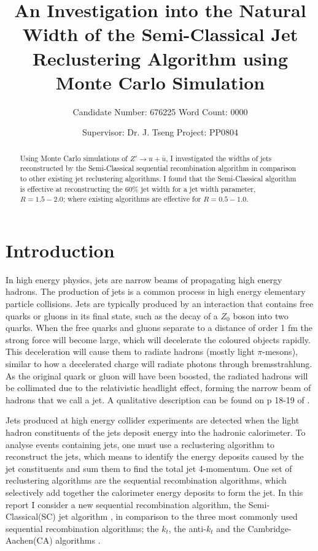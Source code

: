 \documentclass[a4paper,11pt, onecolumn]{article}
\title{\vspace{-0.3 in} An Investigation into the Natural Width of the Semi-Classical Jet Reclustering Algorithm using Monte Carlo Simulation \vspace{-1ex}}
\author{Candidate Number: 676225  \hspace{1in}     Word Count: 0000}
\date{\vspace{-2ex}\hspace{-0.25in}Supervisor: Dr. J. Tseng \hspace{1.2in} Project: PP0804 }
\begin{document}
    \maketitle
    \vspace{-1cm}
    \begin{abstract}
     
         \normalsize
         Using Monte Carlo simulations of $Z' \to u + \bar{u}$, I investigated the widths of jets reconstructed by the Semi-Classical sequential recombination
         algorithm in comparison to other existing jet reclustering algorithms. I found that the Semi-Classical algorithm
         is effective at reconstructing the 60\% jet width for a jet width parameter, $R = 1.5-2.0$; where existing algorithms are effective
         for $R = 0.5-1.0$.
   
    \end{abstract}


\section*{Introduction}

 In high energy physics, jets are narrow beams of propagating high energy hadrons. 
 The production of jets is a common process in high energy elementary particle collisions. Jets are typically 
 produced by an interaction that contains free quarks or gluons in its final state, such as the decay of a $Z_0$ boson into two quarks. When 
 the free quarks and gluons separate to a distance of order 1 fm the strong force will become large, which will decelerate the coloured
 objects rapidly. This deceleration will cause them to radiate hadrons (mostly light $\pi$-mesons), similar to how a decelerated charge will radiate photons through 
 bremsstrahlung. As the original quark or gluon will have been boosted, the radiated hadrons will be collimated due to the relativistic headlight 
 effect, forming the narrow beam of hadrons that we call a jet. A qualitative description can be found on p 18-19 of \cite{HalzenMartin}. \newline

 Jets produced at high energy collider experiments are detected when the light hadron constituents of the jets deposit energy
 into the hadronic calorimeter. To analyse events containing jets, one must use a reclustering algorithm to reconstruct 
 the jets, which means to identify the energy deposits caused by the jet constituents and sum them to find the total jet 4-momentum.
 One set of reclustering algorithms are the sequential recombination algorithms, which selectively add together the calorimeter energy deposits to form the jet.
 In this report I consider a new sequential recombination algorithm, the Semi-Classical(SC)
 jet algorithm \cite{sc}, in comparison to the three most commonly used sequential recombination algorithms;
 the $k_t$, the anti-$k_t$ and the Cambridge-Aachen(CA) algorithms \cite{salam}. \newline
\end{document}
